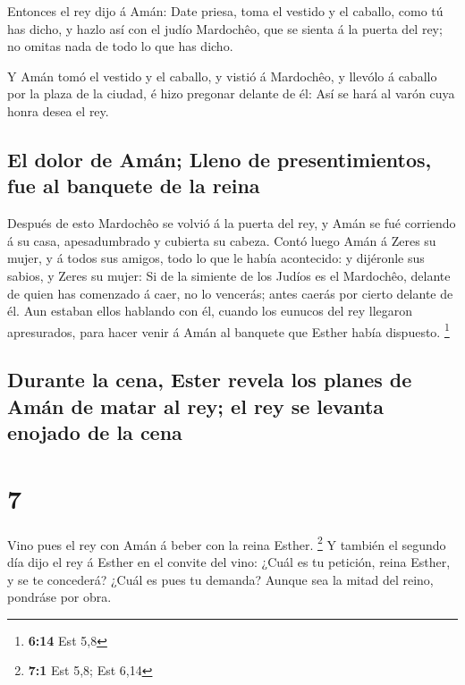  Entonces el rey dijo á Amán: Date priesa, toma el vestido
y el caballo, como tú has dicho, y hazlo así con el judío Mardochêo, que
se sienta á la puerta del rey; no omitas nada de todo lo que has dicho.

 Y Amán tomó el vestido y el caballo, y vistió á Mardochêo,
y llevólo á caballo por la plaza de la ciudad, é hizo pregonar delante
de él: Así se hará al varón cuya honra desea el rey.

\hypertarget{el-dolor-de-amuxe1n-lleno-de-presentimientos-fue-al-banquete-de-la-reina}{%
\subsection{El dolor de Amán; Lleno de presentimientos, fue al banquete
de la
reina}\label{el-dolor-de-amuxe1n-lleno-de-presentimientos-fue-al-banquete-de-la-reina}}

 Después de esto Mardochêo se volvió á la puerta del rey, y
Amán se fué corriendo á su casa, apesadumbrado y cubierta su cabeza.
 Contó luego Amán á Zeres su mujer, y á todos sus amigos,
todo lo que le había acontecido: y dijéronle sus sabios, y Zeres su
mujer: Si de la simiente de los Judíos es el Mardochêo, delante de quien
has comenzado á caer, no lo vencerás; antes caerás por cierto delante de
él.  Aun estaban ellos hablando con él, cuando los eunucos
del rey llegaron apresurados, para hacer venir á Amán al banquete que
Esther había dispuesto. \footnote{\textbf{6:14} Est 5,8}

\hypertarget{durante-la-cena-ester-revela-los-planes-de-amuxe1n-de-matar-al-rey-el-rey-se-levanta-enojado-de-la-cena}{%
\subsection{Durante la cena, Ester revela los planes de Amán de matar al
rey; el rey se levanta enojado de la
cena}\label{durante-la-cena-ester-revela-los-planes-de-amuxe1n-de-matar-al-rey-el-rey-se-levanta-enojado-de-la-cena}}

\hypertarget{section-6}{%
\section{7}\label{section-6}}

 Vino pues el rey con Amán á beber con la reina Esther.
\footnote{\textbf{7:1} Est 5,8; Est 6,14}  Y también el
segundo día dijo el rey á Esther en el convite del vino: ¿Cuál es tu
petición, reina Esther, y se te concederá? ¿Cuál es pues tu demanda?
Aunque sea la mitad del reino, pondráse por obra.

